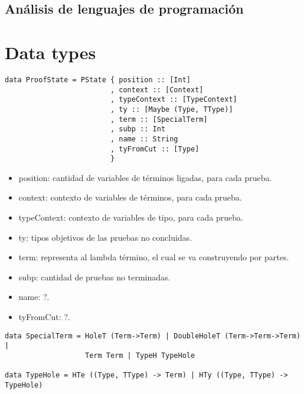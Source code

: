 \documentclass[a4paper,11pt]{article}
\title{}
\author{}
\begin{document}
\maketitle

\begin{center}
\section*{Análisis de lenguajes de programación} 
\end{center}

\newpage{\pagestyle{empty}\cleardoublepage}

\section{Data types}

\begin{verbatim}
data ProofState = PState { position :: [Int]
                         , context :: [Context]
                         , typeContext :: [TypeContext]
                         , ty :: [Maybe (Type, TType)]
                         , term :: [SpecialTerm]
                         , subp :: Int
                         , name :: String
                         , tyFromCut :: [Type]
                         }
\end{verbatim}

\begin{itemize}
  \item position: cantidad de variables de términos ligadas, para cada prueba.
  \item context: contexto de variables de términos, para cada prueba.
  \item typeContext: contexto de variables de tipo, para cada prueba.
  \item ty: tipos objetivos de las pruebas no concluidas.
  \item term: representa al lambda término, el cual se va construyendo por partes.
  \item subp: cantidad de pruebas no terminadas.
  \item name: ?.
  \item tyFromCut: ?.
\end{itemize}


\begin{verbatim}
data SpecialTerm = HoleT (Term->Term) | DoubleHoleT (Term->Term->Term) |
                   Term Term | TypeH TypeHole

data TypeHole = HTe ((Type, TType) -> Term) | HTy ((Type, TType) -> TypeHole)
\end{verbatim}
\end{document}
